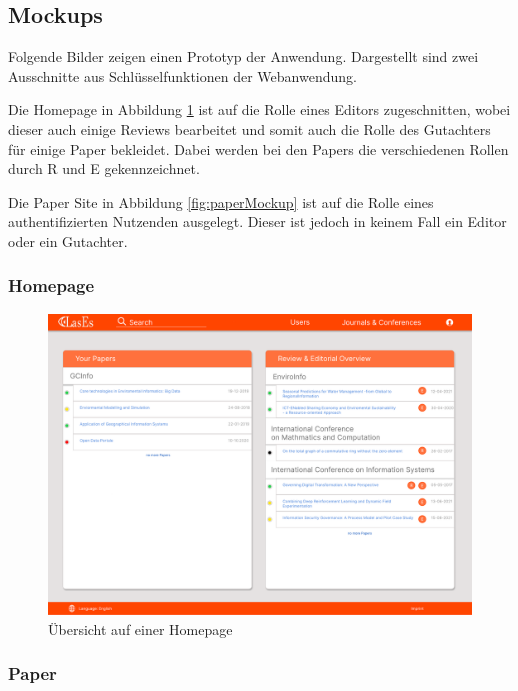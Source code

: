 \subsection{Mockups}

Folgende Bilder zeigen einen Prototyp der Anwendung.
Dargestellt sind zwei Ausschnitte aus Schlüsselfunktionen der Webanwendung.

Die Homepage in Abbildung \ref{fig:homepageMockup} ist auf die Rolle eines Editors zugeschnitten, wobei dieser auch einige
Reviews bearbeitet und somit auch die Rolle des Gutachters für einige Paper bekleidet.
Dabei werden bei den Papers die verschiedenen Rollen durch R und E gekennzeichnet.

Die Paper Site in Abbildung \ref{fig:paperMockup} ist auf die Rolle eines authentifizierten Nutzenden ausgelegt.
Dieser ist jedoch in keinem Fall ein Editor oder ein Gutachter.


\subsubsection{Homepage}

\begin{figure}[H]
	\centering
	\includegraphics[width=\linewidth]{graphics/Homepage}
	\caption{Übersicht auf einer Homepage}
	\label{fig:homepageMockup}
\end{figure}

\subsubsection{Paper}

